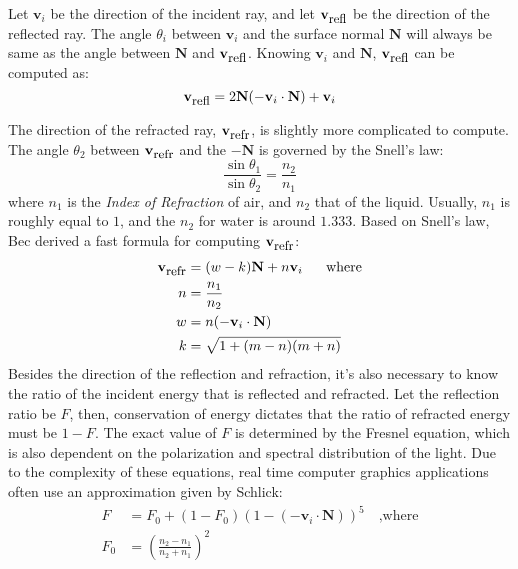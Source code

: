 Let $\textbf{v}_i$ be the direction of the incident ray, and let $\textbf{v}_{\mbox{\small{refl}}}$ be the direction of the reflected ray. The angle $\theta_i$ between $\textbf{v}_i$ and the surface normal $\textbf{N}$ will always be same as the angle between $\textbf{N}$ and $\textbf{v}_{\mbox{\small{refl}}}$. Knowing $\textbf{v}_i$ and $\textbf{N}$, $\textbf{v}_{\mbox{\small{refl}}}$ can be computed as:
\begin{equation}
    \label{eqn direction of reflection}
    \textbf{v}_{\mbox{\small{refl}}} = 2\textbf{N}(-\textbf{v}_i \cdot \textbf{N}) + \textbf{v}_i
\end{equation}

The direction of the refracted ray, $\textbf{v}_{\mbox{\small{refr}}}$, is slightly more complicated to compute. The angle $\theta_2$ between $\textbf{v}_{\mbox{\small{refr}}}$ and the $-\textbf{N}$ is governed by the Snell's law:
$$
\frac{\sin\theta_1}{\sin\theta_2}=\frac{n_2}{n_1}
$$
where $n_1$ is the \textit{Index of Refraction} of air, and $n_2$ that of the liquid. Usually, $n_1$ is roughly equal to $1$, and the $n_2$ for water is around $1.333$. Based on Snell's law, Bec\cite{bec1997faster} derived a fast formula for computing $\textbf{v}_{\mbox{\small{refr}}}$:
\begin{equation}
    \label{eqn direction of refraction}
    \begin{aligned}
        \textbf{v}_{\mbox{\small{refr}}} &= (w-k)\textbf{N} + n\textbf{v}_{i}\mbox{~~~~ where}\\
        n &= \frac{n_1}{n_2}\\
        w &= n(-\textbf{v}_i \cdot \textbf{N}) \\
        k &= \sqrt{1+(m-n)(m+n)} 
    \end{aligned}
\end{equation}
Besides the direction of the reflection and refraction, it's also necessary to know the ratio of the incident energy that is reflected and refracted. Let the reflection ratio be $F$, then, conservation of energy dictates that the ratio of refracted energy must be $1-F$. The exact value of $F$ is determined by the Fresnel equation, which is also dependent on the polarization and spectral distribution of the light. Due to the complexity of these equations, real time computer graphics applications often use an approximation given by Schlick\cite{schlick1994inexpensive}:
\begin{equation}
    \label{eqn Schlick}
    \begin{aligned}
        F &= F_0 + (1-F_0)(1-(-\textbf{v}_i \cdot \textbf{N}))^5\mbox{~~~,where}\\
        F_0 &= \left(\frac{n_2-n_1}{n_2+n_1}\right)^2
    \end{aligned}
\end{equation}


